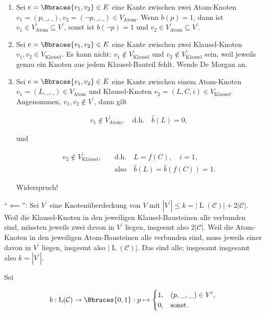 \begin{solution}
\begin{enumerate}[label = \arabic*.]
    \item Sei $e = \Bbraces{v_1, v_2} \in E$ eine Kante zwischen zwei Atom-Knoten $v_1 = (p, \_, \_), v_2 = (\neg p, \_, \_) \in V_\text{Atom}$.
    Wenn $b(p) = 1$, dann ist $v_1 \in V_\text{Atom}^\prime \subseteq V^\prime$, sonst ist $b(\neg p) = 1$ und $v_2 \in V_\text{Atom}^\prime \subseteq V^\prime$.

    \item Sei $e = \Bbraces{v_1, v_2} \in E$ eine Kante zwischen zwei Klausel-Knoten $v_1, v_2 \in V_\text{Klausel}$.
    Es kann nicht: $v_1 \not \in V_\text{Klausel}^\prime$ und $v_2 \not \in V_\text{Klausel}^\prime$ sein, weil jeweils genau ein Knoten aus jedem Klausel-Bauteil fehlt.
    Wende De Morgan an.

    \item Sei $e = \Bbraces{v_1, v_2} \in E$ eine Kante zwischen einem Atom-Knoten $v_1 = (L, \_, \_) \in V_\text{Atom}$ und Klausel-Knoten $v_2 = (L, C, i) \in V_\text{Klausel}$.
    Angenommen, $v_1, v_2 \not \in V^\prime$, dann gilt

    \begin{align*}
        v_1 \not \in V_\text{Atom}^\prime,
        \quad
        \text{d.h.}
        \quad
        \hat b(L) = 0,
    \end{align*}

    und

    \begin{align*}
        v_2 \not \in V_\text{Klausel}^\prime,
        \quad
        & \text{d.h.}
        \quad
        L = f(C), \quad i = 1, \\
        & \text{also}
        \quad
        \hat b(L) = \hat b(f(C)) = 1.
    \end{align*}

    Widerspruch!

\end{enumerate}

\enquote{$\impliedby$}:
Sei $V^\prime$ eine Knotenüberdeckung von $V$ mit $|V^\prime| \leq k = |\operatorname L(\mathcal C)| + 2 |\mathcal C|$.
Weil die Klausel-Knoten in den jeweiligen Klausel-Bausteinen alle verbunden sind, müssten jeweils zwei davon in $V^\prime$ liegen, insgesmt also $2 |\mathcal C|$.
Weil die Atom-Knoten in den jeweiligen Atom-Bausteinen alle verbunden sind, muss jeweils einer davon in $V^\prime$ liegen, insgesmt also $|\operatorname L(\mathcal C)|$.
Das sind alle; insgesamt insgesamt also $k = |V^\prime|$.

Sei

\begin{align*}
    b:
        \operatorname L(\mathcal C) \to \Bbraces{0, 1}:
        p
        \mapsto
        \begin{cases}
            1, & (p, \_, \_) \in V^\prime, \\
            0, & \text{sonst}.
        \end{cases}
\end{align*}


\end{solution}
